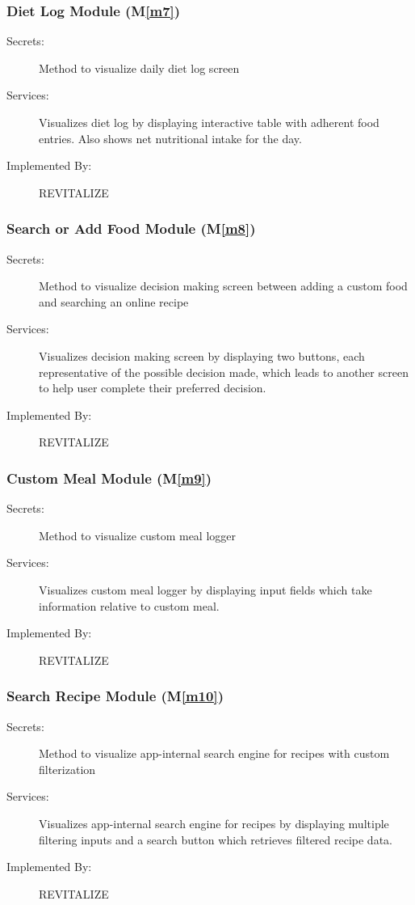 \documentclass[12pt, titlepage]{article}
\newcommand{\mref}[1]{M\ref{#1}}
\begin{document}
\subsubsection{Diet Log Module (\mref{m7})}
\begin{description}
	\item[Secrets:]Method to visualize daily diet log screen
	\item[Services:]Visualizes diet log by displaying interactive table with adherent food entries. Also shows net nutritional intake for the day.
	\item[Implemented By:] REVITALIZE
\end{description}

\subsubsection{Search or Add Food Module (\mref{m8})}
\begin{description}
	\item[Secrets:]Method to visualize decision making screen between adding a custom food and searching an online recipe
	\item[Services:]Visualizes decision making screen by displaying two buttons, each representative of the possible decision made, which leads to another screen to help user complete their preferred decision.
	\item[Implemented By:] REVITALIZE
\end{description}

\subsubsection{Custom Meal Module (\mref{m9})}
\begin{description}
	\item[Secrets:]Method to visualize custom meal logger
	\item[Services:]Visualizes custom meal logger by displaying input fields which take information relative to custom meal.
	\item[Implemented By:] REVITALIZE
\end{description}

\subsubsection{Search Recipe Module (\mref{m10})}
\begin{description}
	\item[Secrets:]Method to visualize app-internal search engine for recipes with custom filterization
	\item[Services:]Visualizes app-internal search engine for recipes by displaying multiple filtering inputs and a search button which retrieves filtered recipe data.
	\item[Implemented By:] REVITALIZE
\end{description}
\end{document}
